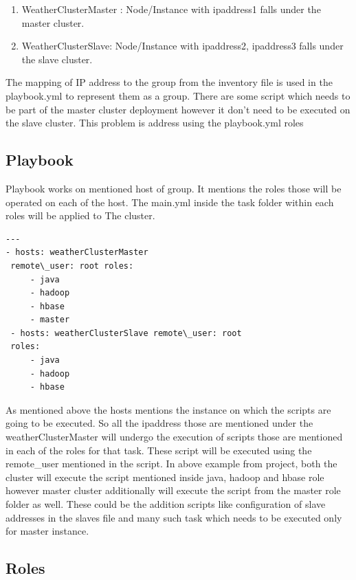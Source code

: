 \documentclass[9pt,twocolumn,twoside]{../../styles/osajnl}
\begin{document}
\begin{enumerate}
\item WeatherClusterMaster : Node/Instance with ipaddress1 falls under the master cluster.
\item WeatherClusterSlave: Node/Instance with ipaddress2, ipaddress3 falls under the slave cluster.
\end{enumerate}
The mapping of IP address to the group from the inventory file is used in the playbook.yml to represent them as a group. There are some script which needs 
to be part of the master cluster deployment however it don’t need to be executed on the slave cluster. This problem is address using the playbook.yml roles


\subsection{Playbook}

Playbook works on mentioned host of group. It mentions the roles those will be operated on each of the host. The main.yml inside the task folder within 
each roles will be applied to The cluster.

\begin{lstlisting}[language=xml,caption=Playbook Modules,breaklines=true]
---
- hosts: weatherClusterMaster
 remote\_user: root roles:
     - java
     - hadoop
     - hbase
     - master
 - hosts: weatherClusterSlave remote\_user: root
 roles:
     - java
     - hadoop
     - hbase
\end{lstlisting}


As mentioned above the hosts mentions the instance on which the scripts are going to be executed. So all the ipaddress those are mentioned under the weatherClusterMaster 
will undergo the execution of scripts those are mentioned in each of the roles for that task.
These script will be executed using the remote\_user mentioned in the script.
In above example from project, both the cluster will execute the script mentioned inside java, hadoop and hbase role however master cluster additionally will execute the script
from the master role folder as well. These could be the addition scripts like configuration of slave addresses in the slaves file and many such task which needs to be executed only for master instance.

\subsection{Roles}
\end{document}
